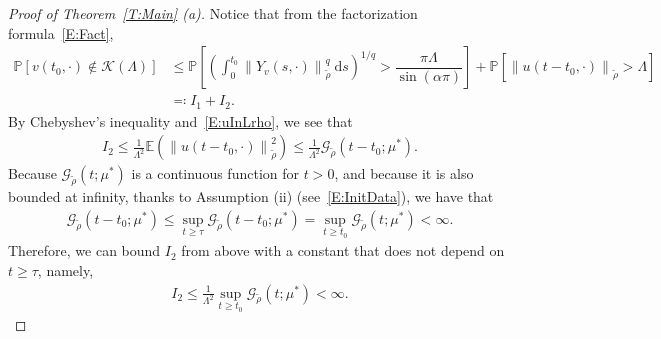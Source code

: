 \documentclass[a4paper,11pt]{article}%
\theoremstyle{plain}
\theoremstyle{definition}
\numberwithin{equation}{section}
\newcommand{\Norm}[1]{\left\| #1 \right\|}
\newcommand{\ud}{\ensuremath{\mathrm{d}}}
\begin{document}
\begin{proof}[Proof of Theorem~\ref{T:Main} (a)]
  Notice that from the factorization formula~\eqref{E:Fact},
  \begin{align*}
    \mathbb{P} \left[ v(t_0,\cdot) \not \in \mathscr{K}(\Lambda) \right ]
    & \le \mathbb{P}\left[ \left(\int_{0}^{t_0} \Norm{Y_v(s,\cdot)}_{\tilde{\rho}}^q \: \ud s\right)^{1/q} > \dfrac{\pi \Lambda}{\sin(\alpha \pi )} \right]
    + \mathbb{P}\left[ \Norm{u(t-t_0,\cdot)}_{\tilde{\rho}} > \Lambda \right] \\
    & \eqqcolon I_1+I_2.
  \end{align*}
  By Chebyshev's inequality and~\eqref{E:uInLrho}, we see that
  \begin{align*}
    I_2\le\frac{1}{\Lambda^2} \mathbb{E}\left(\Norm{u(t-t_0,\cdot)}_{\tilde{\rho}}^2\right)
    \le \frac{1}{\Lambda^2} \mathcal{G}_{\tilde{\rho}}\left(t-t_0;\mu^*\right).
  \end{align*}
  Because $\mathcal{G}_{\tilde{\rho}}(t;\mu^*)$ is a continuous function for $t>0$, and because it
  is also bounded at infinity, thanks to Assumption (ii) (see~\eqref{E:InitData}), we have that
  \begin{align}\label{E:GtBdd}
    \mathcal{G}_{\tilde{\rho}}\left(t-t_0;\mu^*\right)
    \le \sup_{t\ge \tau} \mathcal{G}_{\tilde{\rho}}\left(t-t_0;\mu^*\right)
    = \sup_{t\ge t_0} \mathcal{G}_{\tilde{\rho}}\left(t;\mu^*\right)<\infty.
  \end{align}
  Therefore, we can bound $I_2$ from above with a constant that does not depend on $t\ge \tau$,
  namely,
  \begin{align*}
    I_2 \le\frac{1}{\Lambda^2} \sup_{t\ge t_0} \mathcal{G}_{\tilde{\rho}}\left(t;\mu^*\right)<\infty.
  \end{align*}


\end{proof}
\end{document}
